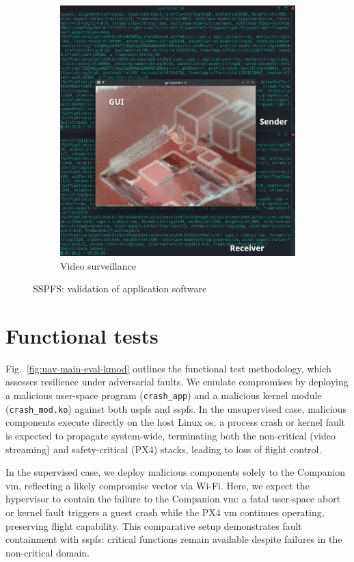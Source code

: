 \begin{figure}[!hbt]
\begin{subfigure}[t]{0.49\textwidth}
    \includegraphics[width=\linewidth]{./img/png/sspfs-cam-qgc}
    \caption{Video surveillance}%
    \label{fig:sspfs-app-validation-2}
  \end{subfigure}
  \caption{SSPFS: validation of application software}
  \label{fig:sspfs-app-validation}
\end{figure}

\section{Functional tests}
\label{sec:functional-tests}
Fig.~\ref{fig:uav-main-eval-kmod} outlines the functional test methodology,
which assesses resilience under adversarial faults. We emulate compromises by
deploying a malicious user-space program (\lstinline{crash_app}) and a malicious
kernel module (\lstinline{crash_mod.ko}) against both \gls{uspfs} and
\gls{sspfs}.
%
In the unsupervised case, malicious components execute directly on the host
Linux \gls{os}; a process crash or kernel fault is expected to propagate
system-wide, terminating both the non-critical (video streaming) and
safety-critical (PX4) stacks, leading to loss of flight control.

In the supervised case, we deploy malicious components solely to the Companion
\gls{vm}, reflecting a likely compromise vector via Wi-Fi. Here, we expect the
hypervisor to contain the failure to the Companion \gls{vm}: a fatal user-space
abort or kernel fault triggers a guest crash while the PX4 \gls{vm} continues
operating, preserving flight capability.
%
This comparative setup demonstrates fault containment with \gls{sspfs}: critical
functions remain available despite failures in the non-critical domain.

